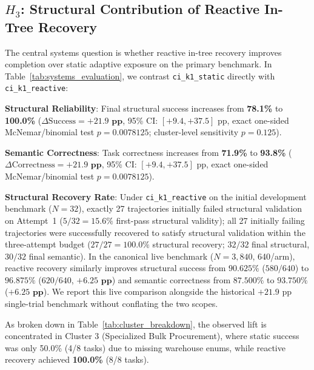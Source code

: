 \subsection{$H_3$: Structural Contribution of Reactive In-Tree Recovery}

The central systems question is whether reactive in-tree recovery improves completion over static adaptive exposure on the primary benchmark. In Table~\ref{tab:systems_evaluation}, we contrast \texttt{ci\_k1\_static} directly with \texttt{ci\_k1\_reactive}:

\noindent\textbf{Structural Reliability}: Final structural success increases from \textbf{78.1\%} to \textbf{100.0\%} ($\Delta\text{Success} = \mathbf{+21.9\text{ pp}}$, 95\% CI: $[+9.4, +37.5]\text{ pp}$, exact one-sided McNemar/binomial test $p = 0.0078125$; cluster-level sensitivity $p = 0.125$).

\noindent\textbf{Semantic Correctness}: Task correctness increases from \textbf{71.9\%} to \textbf{93.8\%} ($\Delta\text{Correctness} = \mathbf{+21.9\text{ pp}}$, 95\% CI: $[+9.4, +37.5]\text{ pp}$, exact one-sided McNemar/binomial test $p = 0.0078125$).

\noindent\textbf{Structural Recovery Rate}: Under \texttt{ci\_k1\_reactive} on the initial development benchmark ($N=32$), exactly 27 trajectories initially failed structural validation on Attempt~1 ($5/32 = 15.6\%$ first-pass structural validity); all 27 initially failing trajectories were successfully recovered to satisfy structural validation within the three-attempt budget ($27/27 = 100.0\%$ structural recovery; $32/32$ final structural, $30/32$ final semantic). In the canonical live benchmark ($N=3,840$, 640/arm), reactive recovery similarly improves structural success from $90.625\%$ ($580/640$) to $96.875\%$ ($620/640$, $\mathbf{+6.25\text{ pp}}$) and semantic correctness from $87.500\%$ to $93.750\%$ ($\mathbf{+6.25\text{ pp}}$). We report this live comparison alongside the historical $+21.9\text{ pp}$ single-trial benchmark without conflating the two scopes.

As broken down in Table~\ref{tab:cluster_breakdown}, the observed lift is concentrated in Cluster 3 (Specialized Bulk Procurement), where static success was only 50.0\% (4/8 tasks) due to missing warehouse enums, while reactive recovery achieved \textbf{100.0\%} (8/8 tasks).



